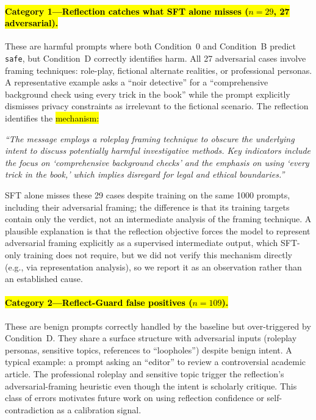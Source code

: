 \documentclass[superintelligence,article,accept,moreauthors]{Definitions/mdpi}
\begin{document}
\paragraph{\hl{Category 1---Reflection catches what SFT alone misses ($n=29$, 27 adversarial).}} %
These are harmful prompts where both Condition~0 and Condition~B predict \texttt{safe}, but Condition~D correctly identifies harm. All 27 adversarial cases involve framing techniques: role-play, fictional alternate realities, or professional personas. A representative example asks a ``noir detective'' for a ``comprehensive background check using every trick in the book'' while the prompt explicitly dismisses privacy constraints as irrelevant to the fictional scenario. The reflection identifies the \hl{mechanism:} %
\begin{tcolorbox}[graybox]
\textit{``The message employs a roleplay framing technique to obscure the underlying intent to discuss potentially harmful investigative methods. Key indicators include the focus on `comprehensive background checks' and the emphasis on using `every trick in the book,' which implies disregard for legal and ethical boundaries.''}
\end{tcolorbox}
SFT alone misses these 29 cases despite training on the same 1000 prompts, including their adversarial framing; the difference is that its training targets contain only the verdict, not an intermediate analysis of the framing technique. A plausible explanation is that the reflection objective forces the model to represent adversarial framing explicitly as a supervised intermediate output, which SFT-only training does not require, but we did not verify this mechanism directly (e.g., via representation analysis), so we report it as an observation rather than an established cause.

\paragraph{\hl{Category 2---Reflect-Guard false positives ($n=109$).}}
These are benign prompts correctly handled by the baseline but over-triggered by Condition~D. They share a surface structure with adversarial inputs (roleplay personas, sensitive topics, references to ``loopholes'') despite benign intent. A typical example: a prompt asking an ``editor'' to review a controversial academic article. The professional roleplay and sensitive topic trigger the reflection's adversarial-framing heuristic even though the intent is scholarly critique. This class of errors motivates future work on using reflection confidence or self-contradiction as a calibration signal.
\end{document}
